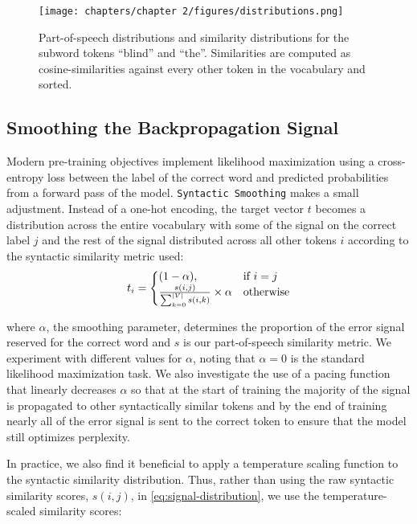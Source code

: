 \begin{figure}[t]
    \centering
    \texttt{[image: chapters/chapter 2/figures/distributions.png]}
    \caption{Part-of-speech distributions and similarity distributions for the subword tokens ``blind'' and ``the''. Similarities are computed as cosine-similarities against every other token in the vocabulary and sorted.}
    \label{fig:distributions}
    \vspace{-1em}
\end{figure}

\subsection{Smoothing the Backpropagation Signal}\label{section:smoothing}

Modern pre-training objectives implement likelihood maximization using a cross-entropy loss between the label of the correct word and predicted probabilities from a forward pass of the model. \texttt{Syntactic Smoothing} makes a small adjustment. Instead of a one-hot encoding, the target vector $t$ becomes a distribution across the entire vocabulary with some of the signal on the correct label $j$ and the rest of the signal distributed across all other tokens $i$ according to the syntactic similarity metric used:
\begin{equation}
\label{eq:signal-distribution}
    t_i=\left\{
  \begin{array}{@{}ll@{}}
    (1-\alpha), & \text{if}\ i=j \\
    \frac{s(i,j)}{\sum_{k=0}^{|V|}{s(i,k)}} \times \alpha & \text{otherwise}
  \end{array}\right.
\end{equation}

\noindent
where $\alpha$, the smoothing parameter, determines the proportion of the error signal reserved for the correct word and $s$ is our part-of-speech similarity metric. We experiment with different values for $\alpha$, noting that $\alpha=0$ is the standard likelihood maximization task. We also investigate the use of a pacing function that linearly decreases $\alpha$ so that at the start of training the majority of the signal is propagated to other syntactically similar tokens and by the end of training nearly all of the error signal is sent to the correct token to ensure that the model still optimizes perplexity. 

In practice, we also find it beneficial to apply a temperature scaling function to the syntactic similarity distribution. Thus, rather than using the raw syntactic similarity scores, $s(i,j)$, in \cref{eq:signal-distribution}, we use the temperature-scaled similarity scores:

